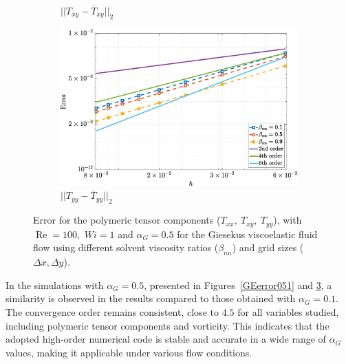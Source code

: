 \documentclass[preprint, 12pt]{elsarticle}
\begin{document}
\begin{figure}[H]
\begin{subfigure}[b]{.46\textwidth}
        \caption{$||T_{xy} - \overline{T}_{xy}||_{2}$}
        \label{error_txy_2nd_Case1_giesekus_alphaG_0.5}
    \end{subfigure}
    \qquad
    \begin{subfigure}[b]{.46\textwidth}
        \includegraphics[width=\textwidth]{NormErr_2nd_Re_100_Wi_1_epsilon_0_xi_0_alphaG_0.5_Dt_1e-06_at_0.05_tipsim_1_MMS_12_Tyy.eps}
        \caption{$||T_{yy} - \overline{T}_{yy}||_{2}$}
        \label{error_tyy_2nd_Case1_giesekus_alphaG_0.5}
    \end{subfigure}
    \vspace{0.02cm}
    \caption{Error for the polymeric tensor components ($T_{xx},~T_{xy},~T_{yy}$), with $\operatorname{Re}=100,$ $Wi=1$ and $\alpha_{G} = 0.5$ for the Giesekus viscoelastic fluid flow using different solvent viscosity ratios ($\beta_{nn}$) and grid sizes ($\Delta x, \Delta y$).\label{GEerror052}}
\end{figure}

In the simulations with $\alpha_G = 0.5$, presented in Figures~\ref{GEerror051}
and \ref{GEerror052}, a similarity is observed in the results compared to those
obtained with $\alpha_G = 0.1$. The convergence order remains consistent, close
to $4.5$ for all variables studied, including polymeric tensor components and
vorticity. This indicates that the {\color{red} adopted high-order numerical code is stable
and accurate in a wide range of $\alpha_G$ values, making it applicable under
various flow conditions.}
\end{document}
